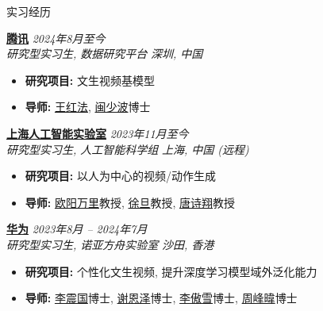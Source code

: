 \documentclass[a4paper]{resume} %
\begin{document}
\begin{rSection}{实习经历}

{\bf \href{https://www.tencent.com/en-us/}{腾讯}} \hfill{\it 2024年8月至今}\\
{\it 研究型实习生, 数据研究平台} \hfill{\it 深圳, 中国}
\begin{itemize}
    \item {\bf 研究项目:} 文生视频基模型
 	\item {\bf 导师:} \href{https://scholar.google.com.hk/citations?user=q9Fn50QAAAAJ}{王红法}, \href{https://mbobogo.github.io/}{闽少波}博士
\end{itemize}


{\bf \href{https://www.shlab.org.cn}{上海人工智能实验室}} \hfill{\it 2023年11月至今}\\
{\it 研究型实习生, 人工智能科学组} \hfill{\it 上海, 中国 (远程)}
\begin{itemize}
    \item {\bf 研究项目:} 以人为中心的视频/动作生成
 	\item {\bf 导师:} \href{https://wlouyang.github.io/}{欧阳万里}教授, \href{https://www.danxurgb.net/}{徐旦}教授, \href{https://scholar.google.com.tw/citations?user=TJ4ihdkAAAAJ}{唐诗翔}教授
\end{itemize}

{\bf \href{https://www.huawei.com/cn/}{华为}} \hfill{\it 2023年8月 -- 2024年7月}\\
{\it 研究型实习生, 诺亚方舟实验室} \hfill{\it 沙田, 香港}
\begin{itemize}
    \item {\bf 研究项目:} 个性化文生视频, 提升深度学习模型域外泛化能力
 	\item {\bf 导师:} \href{https://zhenguol.github.io/}{李震国}博士, \href{https://xieenze.github.io/}{谢恩泽}博士, \href{https://openreview.net/profile?id=~Aoxue_Li2}{李傲雪}博士, \href{https://scholar.google.com.hk/citations?user=1M00Yg8AAAAJ}{周峰暐}博士
\end{itemize}


\end{rSection}
\end{document}
